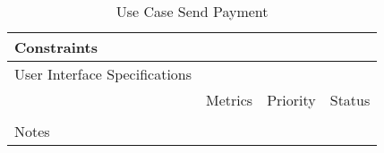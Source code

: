 \begin{table}[H]
\begin{tabularx}{\linewidth}{|l|X|X|X|}
    \hline Constraints                   & \multicolumn{3}{l|}{}                                                                                 \\

    \hline User Interface Specifications & \multicolumn{3}{l|}{}                                                                                 \\

    \hline \multirow{2}{*}{}             & Metrics                                                                           & Priority & Status \\
    \cline{2-4}                          &                                                                                   &          &        \\
    \hline Notes                         & \multicolumn{3}{l|}{}                                                                                 \\
    \hline
  \end{tabularx}
  \caption{Use Case Send Payment}
  \label{tab:use_case_send_payment}
\end{table}

